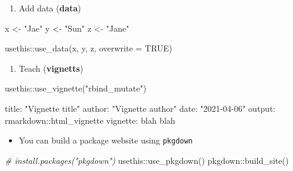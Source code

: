 \documentclass[
]{book}
\newenvironment{Shaded}{\begin{snugshade}}{\end{snugshade}}
\newcommand{\AttributeTok}[1]{\textcolor[rgb]{0.77,0.63,0.00}{#1}}
\newcommand{\CommentTok}[1]{\textcolor[rgb]{0.56,0.35,0.01}{\textit{#1}}}
\newcommand{\ConstantTok}[1]{\textcolor[rgb]{0.00,0.00,0.00}{#1}}
\newcommand{\FunctionTok}[1]{\textcolor[rgb]{0.00,0.00,0.00}{#1}}
\newcommand{\NormalTok}[1]{#1}
\newcommand{\OtherTok}[1]{\textcolor[rgb]{0.56,0.35,0.01}{#1}}
\newcommand{\SpecialCharTok}[1]{\textcolor[rgb]{0.00,0.00,0.00}{#1}}
\newcommand{\StringTok}[1]{\textcolor[rgb]{0.31,0.60,0.02}{#1}}
\providecommand{\tightlist}{%
  \setlength{\itemsep}{0pt}\setlength{\parskip}{0pt}}
\begin{document}
\begin{enumerate}
\def\labelenumi{\arabic{enumi}.}
\setcounter{enumi}{1}
\tightlist
\item
  Add data (\textbf{data})
\end{enumerate}

\begin{Shaded}
\begin{Highlighting}[]
\NormalTok{x }\OtherTok{\textless{}{-}} \StringTok{"Jae"}
\NormalTok{y }\OtherTok{\textless{}{-}} \StringTok{"Sun"}
\NormalTok{z }\OtherTok{\textless{}{-}} \StringTok{"Jane"}

\NormalTok{usethis}\SpecialCharTok{::}\FunctionTok{use\_data}\NormalTok{(x, y, z, }\AttributeTok{overwrite =} \ConstantTok{TRUE}\NormalTok{)}
\end{Highlighting}
\end{Shaded}

\begin{enumerate}
\def\labelenumi{\arabic{enumi}.}
\setcounter{enumi}{2}
\tightlist
\item
  Teach (\textbf{vignetts})
\end{enumerate}

\begin{Shaded}
\begin{Highlighting}[]
\NormalTok{usethis}\SpecialCharTok{::}\FunctionTok{use\_vignette}\NormalTok{(}\StringTok{"rbind\_mutate"}\NormalTok{)}
\end{Highlighting}
\end{Shaded}

\begin{Shaded}
\begin{Highlighting}[]
\NormalTok{title}\SpecialCharTok{:} \StringTok{"Vignette title"}
\NormalTok{author}\SpecialCharTok{:} \StringTok{"Vignette author"}
\NormalTok{date}\SpecialCharTok{:} \StringTok{"2021{-}04{-}06"}
\NormalTok{output}\SpecialCharTok{:}\NormalTok{ rmarkdown}\SpecialCharTok{::}\NormalTok{html\_vignette}
\NormalTok{vignette}\SpecialCharTok{:}\NormalTok{ blah blah}
\end{Highlighting}
\end{Shaded}

\begin{itemize}
\tightlist
\item
  You can build a package website using \texttt{pkgdown}
\end{itemize}

\begin{Shaded}
\begin{Highlighting}[]
\CommentTok{\# install.packages("pkgdown")}
\NormalTok{usethis}\SpecialCharTok{::}\FunctionTok{use\_pkgdown}\NormalTok{()}
\NormalTok{pkgdown}\SpecialCharTok{::}\FunctionTok{build\_site}\NormalTok{()}
\end{Highlighting}
\end{Shaded}
\end{document}
